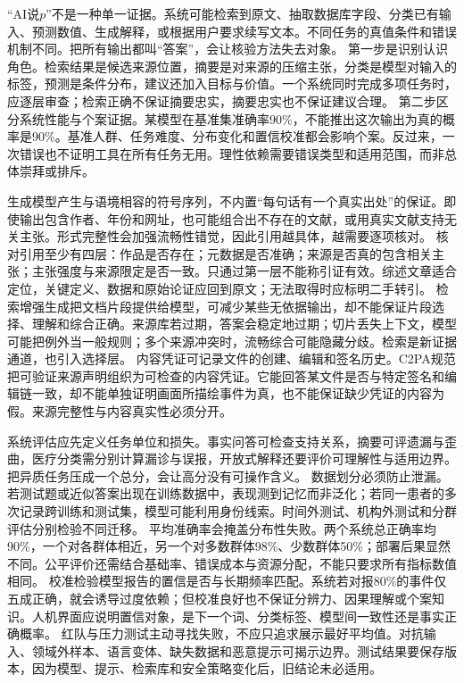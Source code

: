  “AI说$p$”不是一种单一证据。系统可能检索到原文、抽取数据库字段、分类已有输入、预测数值、生成解释，或根据用户要求续写文本。不同任务的真值条件和错误机制不同。把所有输出都叫“答案”，会让核验方法失去对象。 第一步是识别认识角色。检索结果是候选来源位置，摘要是对来源的压缩主张，分类是模型对输入的标签，预测是条件分布，建议还加入目标与价值。一个系统同时完成多项任务时，应逐层审查；检索正确不保证摘要忠实，摘要忠实也不保证建议合理。 第二步区分系统性能与个案证据。某模型在基准集准确率90\%，不能推出这次输出为真的概率是90\%。基准人群、任务难度、分布变化和置信校准都会影响个案。反过来，一次错误也不证明工具在所有任务无用。理性依赖需要错误类型和适用范围，而非总体崇拜或排斥。

生成模型产生与语境相容的符号序列，不内置“每句话有一个真实出处”的保证\parencite{bender2021}。即使输出包含作者、年份和网址，也可能组合出不存在的文献，或用真实文献支持无关主张。形式完整性会加强流畅性错觉，因此引用越具体，越需要逐项核对。 核对引用至少有四层：作品是否存在；元数据是否准确；来源是否真的包含相关主张；主张强度与来源限定是否一致。只通过第一层不能称引证有效。综述文章适合定位，关键定义、数据和原始论证应回到原文；无法取得时应标明二手转引。 检索增强生成把文档片段提供给模型，可减少某些无依据输出，却不能保证片段选择、理解和综合正确。来源库若过期，答案会稳定地过期；切片丢失上下文，模型可能把例外当一般规则；多个来源冲突时，流畅综合可能隐藏分歧。检索是新证据通道，也引入选择层。 内容凭证可记录文件的创建、编辑和签名历史。C2PA规范把可验证来源声明组织为可检查的内容凭证\parencite{c2pa2025}。它能回答某文件是否与特定签名和编辑链一致，却不能单独证明画面所描绘事件为真，也不能保证缺少凭证的内容为假。来源完整性与内容真实性必须分开。

系统评估应先定义任务单位和损失。事实问答可检查支持关系，摘要可评遗漏与歪曲，医疗分类需分别计算漏诊与误报，开放式解释还要评价可理解性与适用边界。把异质任务压成一个总分，会让高分没有可操作含义。 数据划分必须防止泄漏。若测试题或近似答案出现在训练数据中，表现测到记忆而非泛化；若同一患者的多次记录跨训练和测试集，模型可能利用身份线索。时间外测试、机构外测试和分群评估分别检验不同迁移。 平均准确率会掩盖分布性失败。两个系统总正确率均90\%，一个对各群体相近，另一个对多数群体98\%、少数群体50\%；部署后果显然不同。公平评价还需结合基础率、错误成本与资源分配，不能只要求所有指标数值相同\parencite{buolamwini2018}。 校准检验模型报告的置信是否与长期频率匹配。系统若对报80\%的事件仅五成正确，就会诱导过度依赖；但校准良好也不保证分辨力、因果理解或个案知识。人机界面应说明置信对象，是下一个词、分类标签、模型间一致性还是事实正确概率。 红队与压力测试主动寻找失败，不应只追求展示最好平均值。对抗输入、领域外样本、语言变体、缺失数据和恶意提示可揭示边界。测试结果要保存版本，因为模型、提示、检索库和安全策略变化后，旧结论未必适用。

